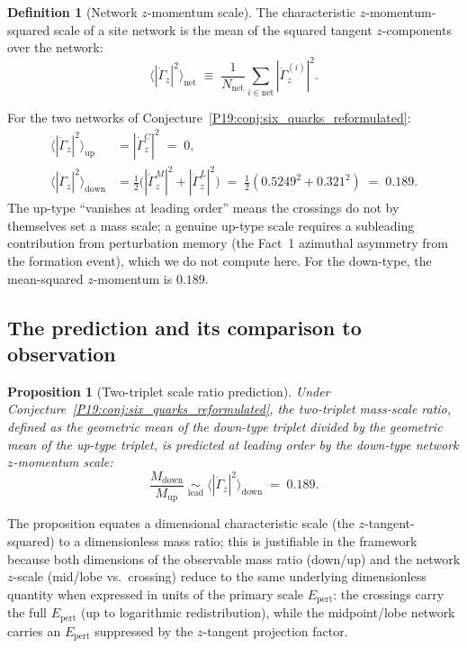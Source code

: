 \documentclass[11pt,a4paper]{article}
\newtheorem{proposition}[theorem]{Proposition}
\theoremstyle{definition}\newtheorem{definition}[theorem]{Definition}
\theoremstyle{remark}
\newcommand{\tang}{\dot\Gamma}
\begin{document}
\begin{definition}[Network $z$-momentum scale]
\label{P19:def:z_scale}
The characteristic $z$-momentum-squared scale of a site network is
the mean of the squared tangent $z$-components over the network:
\begin{equation}
  \bigl\langle |\tang_z|^2\bigr\rangle_{\mathrm{net}}
  \;\equiv\; \frac{1}{N_{\mathrm{net}}}\sum_{i\in\mathrm{net}}
  |\tang_z^{(i)}|^2.
  \label{P19:eq:network_scale_def}
\end{equation}
\end{definition}

For the two networks of
Conjecture~\ref{P19:conj:six_quarks_reformulated}:
\begin{align}
  \bigl\langle |\tang_z|^2\bigr\rangle_{\mathrm{up}}
  &= |\tang_z^C|^2 \;=\; 0, \\
  \bigl\langle |\tang_z|^2\bigr\rangle_{\mathrm{down}}
  &= \tfrac{1}{2}\bigl(|\tang_z^M|^2 + |\tang_z^L|^2\bigr)
  \;=\; \tfrac{1}{2}(0.5249^2 + 0.321^2) \;=\; 0.189.
  \label{P19:eq:network_scales}
\end{align}
The up-type ``vanishes at leading order'' means the crossings do
not by themselves set a mass scale; a genuine up-type scale
requires a subleading contribution from perturbation memory
(the Fact~1 azimuthal asymmetry from the formation event), which
we do not compute here.  For the down-type, the mean-squared
$z$-momentum is $0.189$.

\subsection{The prediction and its comparison to observation}

\begin{proposition}[Two-triplet scale ratio prediction]
\label{P19:prop:triplet_ratio}
Under Conjecture~\ref{P19:conj:six_quarks_reformulated}, the two-triplet
mass-scale ratio, defined as the geometric mean of the down-type
triplet divided by the geometric mean of the up-type triplet, is
predicted at leading order by the down-type network $z$-momentum
scale:
\begin{equation}
  \frac{M_{\mathrm{down}}}{M_{\mathrm{up}}}
  \;\underset{\text{lead}}{\sim}\;
  \bigl\langle |\tang_z|^2\bigr\rangle_{\mathrm{down}}
  \;=\; 0.189.
  \label{P19:eq:triplet_ratio_pred}
\end{equation}
\end{proposition}

The proposition equates a dimensional characteristic scale (the
$z$-tangent-squared) to a dimensionless mass ratio; this is
justifiable in the framework because both dimensions of the
observable mass ratio (down/up) and the network $z$-scale
(mid/lobe vs.\ crossing) reduce to the same underlying
dimensionless quantity when expressed in units of the primary
scale $E_{\mathrm{pert}}$: the crossings carry the full
$E_{\mathrm{pert}}$ (up to logarithmic redistribution), while the
midpoint/lobe network carries an $E_{\mathrm{pert}}$ suppressed by
the $z$-tangent projection factor.
\end{document}

